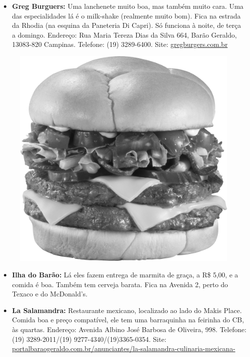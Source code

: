 \begin{itemize}
\item  \textbf{Greg Burguers:} Uma lanchenete muito boa, mas também muito cara. Uma das especialidades lá é o milk-shake (realmente muito bom). Fica na estrada da Rhodia (na esquina da Paneteria Di Capri). Só funciona à noite, de terça a domingo. Endereço: Rua Maria Tereza Dias da Silva 664, Barão Geraldo, 13083-820 Campinas. Telefone: (19) 3289-6400. Site: \url{gregburgers.com.br}
\end{itemize}
\begin{figure}[h!]
    \centering
    \includegraphics[scale=0.48,keepaspectratio=true]{img/imgs/6-comida/burger.jpg}
\end{figure}


\begin{itemize}
\item  \textbf{Ilha do Barão:} Lá eles fazem entrega de marmita de graça, a R\$ 5,00, e a comida é boa. Também tem cerveja barata. Fica na Avenida 2, perto do Texaco e do McDonald's.
\end{itemize}

\begin{itemize}
\item  \textbf{La Salamandra:} Restaurante mexicano, localizado ao lado do Makis Place. Comida boa e preço compatível, ele tem uma barraquinha na feirinha do CB, às quartas. Endereço: Avenida Albino José Barbosa de Oliveira, 998. Telefone: (19) 3289-2011/(19) 9277-4340/(19)3365-0354. Site: \url{portalbaraogeraldo.com.br/anunciantes/la-salamandra-culinaria-mexicana-}
\end{itemize}

